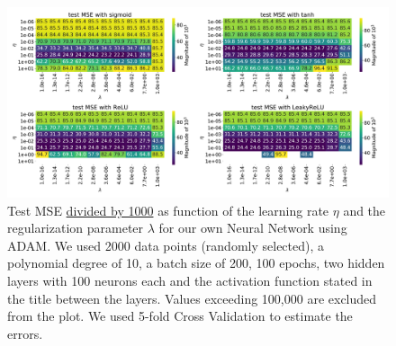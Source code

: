 \documentclass[11pt,a4paper,titlepage]{article}
\begin{document}
\begin{figure}[H]
\centering
\includegraphics[width=1.0\textwidth]{2_layers_short.pdf}
\caption[4 hidden layers, 100 epochs]{Test MSE \underline{divided by 1000} as function of the learning rate $\eta$ and the regularization parameter $\lambda$ for our own Neural Network using ADAM. We used 2000 data points (randomly selected), a polynomial degree of 10, a batch size of 200, 100 epochs, two hidden layers with 100 neurons each and the activation function stated in the title between the layers. Values exceeding 100,000 are excluded from the plot. We used 5-fold Cross Validation to estimate the errors.} \label{fig:2layers}
\end{figure}




\end{document}
